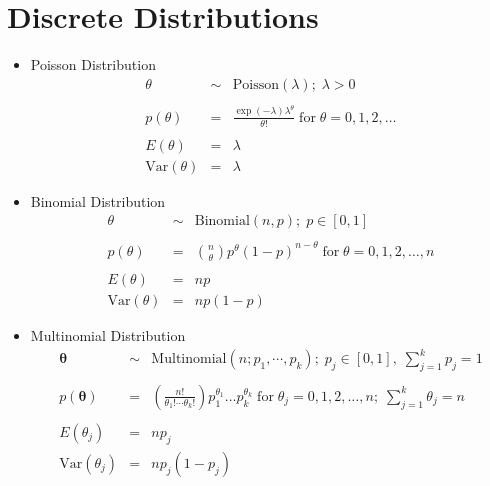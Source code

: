 \documentclass[10pt,a4paper]{article}
\begin{document}
\section*{Discrete Distributions}

\bigskip

\begin{itemize}
\item Poisson Distribution 
\begin{eqnarray*}
\theta &\sim& \mathrm{Poisson}(\lambda); \; \lambda > 0 \\\\
p(\theta) &=& \frac{\exp(-\lambda) \lambda^{\theta}}{\theta !} \; \mathrm{for} \; \theta=0,1,2,\dots \\\\
E(\theta) &=& \lambda \\
\mathrm{Var}(\theta) &=& \lambda
\end{eqnarray*}

\bigskip

\item Binomial Distribution 
\begin{eqnarray*}
\theta &\sim& \mathrm{Binomial}(n,p); \; p \in [0,1] \\\\
p(\theta) &=& \binom{n}{\theta} p^{\theta} (1-p)^{n-\theta} \; \mathrm{for} \; \theta=0,1,2,\dots,n \\\\
E(\theta) &=& np \\
\mathrm{Var}(\theta) &=& np(1-p)
\end{eqnarray*}

\bigskip

\item Multinomial Distribution 
\begin{eqnarray*}
\bm{\theta} &\sim& \mathrm{Multinomial}(n; p_1,\cdots,p_k); \; p_j \in [0,1], \; \sum_{j=1}^k p_j =1 \\\\
p(\bm{\theta}) &=& \left( \frac{n!}{\theta_1! \cdots \theta_k!} \right) p^{\theta_1}_1 \dots p_k^{\theta_k} \; \mathrm{for} \; \theta_j=0,1,2,\dots,n; \; \sum_{j=1}^k \theta_j = n \\\\
E(\theta_j) &=& np_j \\
\mathrm{Var}(\theta_j) &=& np_j(1-p_j)
\end{eqnarray*}

\end{itemize}
\end{document}

